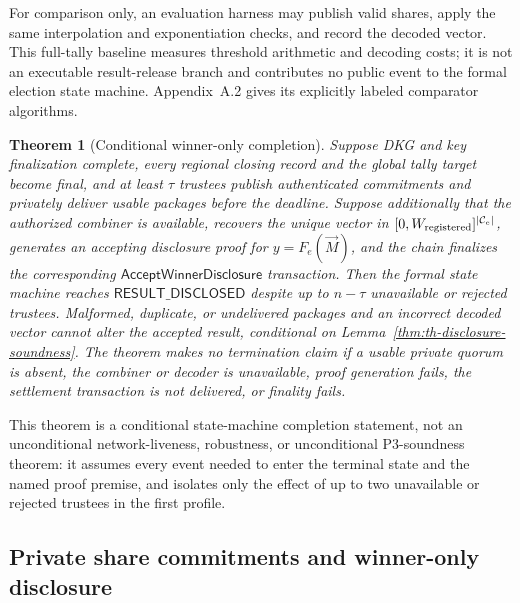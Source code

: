 \documentclass[pdflatex,sn-mathphys-num]{sn-jnl}%
\theoremstyle{thmstyleone}%
\newtheorem{theorem}{Theorem}%
\theoremstyle{thmstyletwo}%
\theoremstyle{thmstylethree}%
\begin{document}
For comparison only, an evaluation harness may publish valid shares, apply the
same interpolation and exponentiation checks, and record the decoded vector.
This full-tally baseline measures threshold arithmetic and decoding costs; it
is not an executable result-release branch and contributes no public event to
the formal election state machine.  Appendix~A.2 gives its explicitly labeled
comparator algorithms.

\begin{theorem}[Conditional winner-only completion]
\label{thm:threshold-completion}
Suppose DKG and key finalization complete, every regional closing record and
the global tally target become final, and at least $\tau$ trustees publish
authenticated commitments and privately deliver usable packages before the
deadline.  Suppose additionally that the authorized combiner is available,
recovers the unique vector in
$[0,W_{\rm registered}]^{|\mathcal C_e|}$, generates an accepting disclosure
proof for $y=F_e(\vec M)$, and the chain finalizes the corresponding
$\mathsf{AcceptWinnerDisclosure}$ transaction.  Then the formal state machine
reaches $\mathsf{RESULT\_DISCLOSED}$ despite up to $n-\tau$ unavailable or
rejected trustees.  Malformed, duplicate, or undelivered packages and an
incorrect decoded vector cannot alter the accepted result, conditional on
Lemma~\ref{thm:th-disclosure-soundness}.  The theorem makes no termination
claim if a usable private quorum is absent, the combiner or decoder is
unavailable, proof generation fails, the settlement transaction is not
delivered, or finality fails.
\end{theorem}

This theorem is a conditional state-machine completion statement, not an
unconditional network-liveness, robustness, or unconditional P3-soundness
theorem: it assumes every event needed to enter the terminal state and the
named proof premise, and isolates only the effect of up to two unavailable or
rejected trustees in the first profile.

\subsection{Private share commitments and winner-only disclosure}
\label{subsec:threshold-winner-disclosure}
\end{document}
